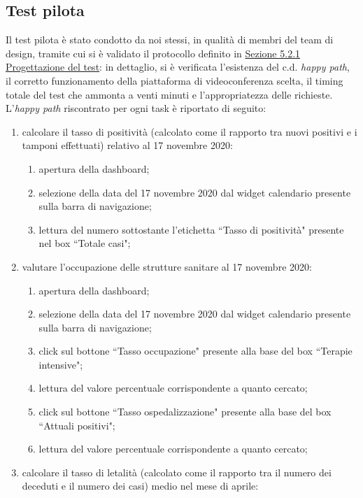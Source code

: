 \subsection{Test pilota}
\label{ss:test-pilota}
Il test pilota è stato condotto da noi stessi, in qualità di membri del team di design, tramite cui si è validato il protocollo definito in \hyperref[ss:vd-progettazione-test]{Sezione 5.2.1 Progettazione del test}: in dettaglio, si è verificata l'esistenza del c.d. \textit{happy path}, il corretto funzionamento della piattaforma di videoconferenza scelta, il timing totale del test che ammonta a venti minuti e l'appropriatezza delle richieste.\\
L'\textit{happy path} riscontrato per ogni task è riportato di seguito:
\begin{enumerate}
    \item calcolare il tasso di positività (calcolato come il rapporto tra nuovi positivi e i tamponi effettuati) relativo al 17 novembre 2020:
    \begin{enumerate}
        \item apertura della dashboard;
        \item selezione della data del 17 novembre 2020 dal widget calendario presente sulla barra di navigazione;
        \item lettura del numero sottostante l'etichetta ``Tasso di positività" presente nel box ``Totale casi";
    \end{enumerate}
    \item valutare l'occupazione delle strutture sanitare al 17 novembre 2020:
    \begin{enumerate}
        \item apertura della dashboard;
        \item selezione della data del 17 novembre 2020 dal widget calendario presente sulla barra di navigazione;
        \item click sul bottone ``Tasso occupazione" presente alla base del box ``Terapie intensive";
        \item lettura del valore percentuale corrispondente a quanto cercato;
        \item click sul bottone ``Tasso ospedalizzazione" presente alla base del box ``Attuali positivi";
        \item lettura del valore percentuale corrispondente a quanto cercato;
    \end{enumerate}
    \item calcolare il tasso di letalità (calcolato come il rapporto tra il numero dei deceduti e il numero dei casi) medio nel mese di aprile:

\end{enumerate}
